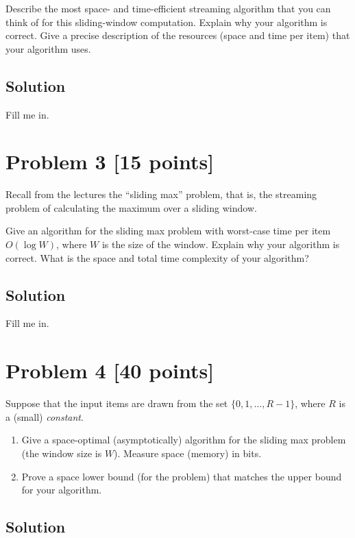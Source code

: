 \documentclass[11pt]{article}
\begin{document}
Describe the most space- and time-efficient streaming algorithm that you can think of for this sliding-window computation. Explain why your algorithm is correct. Give a precise description of the resources (space and time per item) that your algorithm uses.

\subsection*{Solution}

Fill me in.

\newpage
\section*{Problem 3 [15 points]}

Recall from the lectures the ``sliding max'' problem, that is, the streaming problem of calculating the maximum over a sliding window.

Give an algorithm for the sliding max problem with worst-case time per item $O(\log W)$, where $W$ is the size of the window. Explain why your algorithm is correct. What is the space and total time complexity of your algorithm?

\subsection*{Solution}

Fill me in.

\newpage
\section*{Problem 4 [40 points]}

Suppose that the input items are drawn from the set $\{ 0, 1, \ldots, R-1 \}$, where $R$ is a (small) \emph{constant}.
\begin{enumerate}[\ (1)]
\item
Give a space-optimal (asymptotically) algorithm for the sliding max problem (the window size is $W$). Measure space (memory) in bits.
\item
Prove a space lower bound (for the problem) that matches the upper bound for your algorithm.
\end{enumerate}

\subsection*{Solution}
\end{document}
